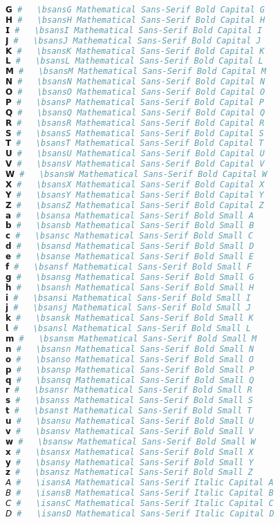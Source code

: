 \begin{lstlisting}[language=Julia]
𝗚 #   \bsansG Mathematical Sans-Serif Bold Capital G
𝗛 #   \bsansH Mathematical Sans-Serif Bold Capital H
𝗜 #   \bsansI Mathematical Sans-Serif Bold Capital I
𝗝 #   \bsansJ Mathematical Sans-Serif Bold Capital J
𝗞 #   \bsansK Mathematical Sans-Serif Bold Capital K
𝗟 #   \bsansL Mathematical Sans-Serif Bold Capital L
𝗠 #   \bsansM Mathematical Sans-Serif Bold Capital M
𝗡 #   \bsansN Mathematical Sans-Serif Bold Capital N
𝗢 #   \bsansO Mathematical Sans-Serif Bold Capital O
𝗣 #   \bsansP Mathematical Sans-Serif Bold Capital P
𝗤 #   \bsansQ Mathematical Sans-Serif Bold Capital Q
𝗥 #   \bsansR Mathematical Sans-Serif Bold Capital R
𝗦 #   \bsansS Mathematical Sans-Serif Bold Capital S
𝗧 #   \bsansT Mathematical Sans-Serif Bold Capital T
𝗨 #   \bsansU Mathematical Sans-Serif Bold Capital U
𝗩 #   \bsansV Mathematical Sans-Serif Bold Capital V
𝗪 #   \bsansW Mathematical Sans-Serif Bold Capital W
𝗫 #   \bsansX Mathematical Sans-Serif Bold Capital X
𝗬 #   \bsansY Mathematical Sans-Serif Bold Capital Y
𝗭 #   \bsansZ Mathematical Sans-Serif Bold Capital Z
𝗮 #   \bsansa Mathematical Sans-Serif Bold Small A
𝗯 #   \bsansb Mathematical Sans-Serif Bold Small B
𝗰 #   \bsansc Mathematical Sans-Serif Bold Small C
𝗱 #   \bsansd Mathematical Sans-Serif Bold Small D
𝗲 #   \bsanse Mathematical Sans-Serif Bold Small E
𝗳 #   \bsansf Mathematical Sans-Serif Bold Small F
𝗴 #   \bsansg Mathematical Sans-Serif Bold Small G
𝗵 #   \bsansh Mathematical Sans-Serif Bold Small H
𝗶 #   \bsansi Mathematical Sans-Serif Bold Small I
𝗷 #   \bsansj Mathematical Sans-Serif Bold Small J
𝗸 #   \bsansk Mathematical Sans-Serif Bold Small K
𝗹 #   \bsansl Mathematical Sans-Serif Bold Small L
𝗺 #   \bsansm Mathematical Sans-Serif Bold Small M
𝗻 #   \bsansn Mathematical Sans-Serif Bold Small N
𝗼 #   \bsanso Mathematical Sans-Serif Bold Small O
𝗽 #   \bsansp Mathematical Sans-Serif Bold Small P
𝗾 #   \bsansq Mathematical Sans-Serif Bold Small Q
𝗿 #   \bsansr Mathematical Sans-Serif Bold Small R
𝘀 #   \bsanss Mathematical Sans-Serif Bold Small S
𝘁 #   \bsanst Mathematical Sans-Serif Bold Small T
𝘂 #   \bsansu Mathematical Sans-Serif Bold Small U
𝘃 #   \bsansv Mathematical Sans-Serif Bold Small V
𝘄 #   \bsansw Mathematical Sans-Serif Bold Small W
𝘅 #   \bsansx Mathematical Sans-Serif Bold Small X
𝘆 #   \bsansy Mathematical Sans-Serif Bold Small Y
𝘇 #   \bsansz Mathematical Sans-Serif Bold Small Z
𝘈 #   \isansA Mathematical Sans-Serif Italic Capital A
𝘉 #   \isansB Mathematical Sans-Serif Italic Capital B
𝘊 #   \isansC Mathematical Sans-Serif Italic Capital C
𝘋 #   \isansD Mathematical Sans-Serif Italic Capital D

\end{lstlisting}
